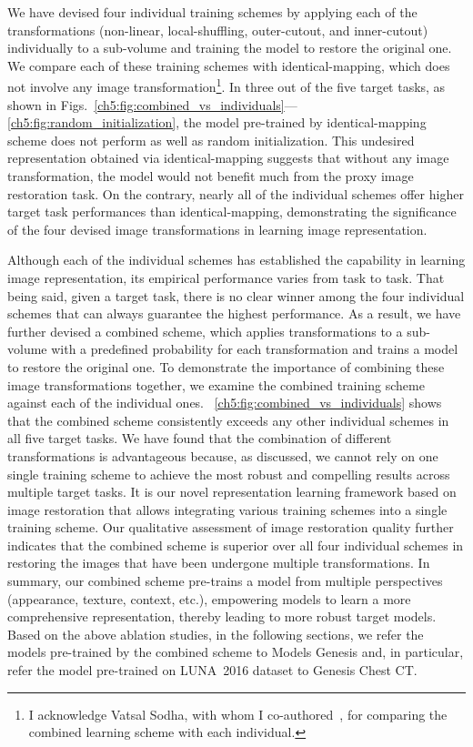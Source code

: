 We have devised four individual training schemes by applying each of the transformations (\ie non-linear, local-shuffling, outer-cutout, and inner-cutout) individually to a sub-volume and training the model to restore the original one. We compare each of these training schemes with identical-mapping, which does not involve any image transformation\footnote{I acknowledge Vatsal Sodha, with whom I co-authored~\citet{zhou2019models,zhou2021models}, for comparing the combined learning scheme with each individual.}. In three out of the five target tasks, as shown in Figs.~\ref{ch5:fig:combined_vs_individuals}---\ref{ch5:fig:random_initialization}, the model pre-trained by identical-mapping scheme does not perform as well as random initialization. This undesired representation obtained via identical-mapping suggests that without any image transformation, the model would not benefit much from the proxy image restoration task. On the contrary, nearly all of the individual schemes offer higher target task performances than identical-mapping, demonstrating the significance of the four devised image transformations in learning image representation. 

Although each of the individual schemes has established the capability in learning image representation, its empirical performance varies from task to task. That being said, given a target task, there is no clear winner among the four individual schemes that can always guarantee the highest performance. As a result, we have further devised a combined scheme, which applies transformations to a sub-volume with a predefined probability for each transformation and trains a model to restore the original one. To demonstrate the importance of combining these image transformations together, we examine the combined training scheme against each of the individual ones. \figurename~\ref{ch5:fig:combined_vs_individuals} shows that the combined scheme consistently exceeds any other individual schemes in all five target tasks. We have found that the combination of different transformations is advantageous because, as discussed, we cannot rely on one single training scheme to achieve the most robust and compelling results across multiple target tasks. 
It is our novel representation learning framework based on image restoration that allows integrating various training schemes into a single training scheme. Our qualitative assessment of image restoration quality further indicates that the combined scheme is superior over all four individual schemes in restoring the images that have been undergone multiple transformations. In summary, our combined scheme pre-trains a model from multiple perspectives (appearance, texture, context, etc.), empowering models to learn a more comprehensive representation, thereby leading to more robust target models. Based on the above ablation studies, in the following sections, we refer the models pre-trained by the combined scheme to Models Genesis and, in particular, refer the model pre-trained on LUNA~2016 dataset to Genesis Chest CT.


